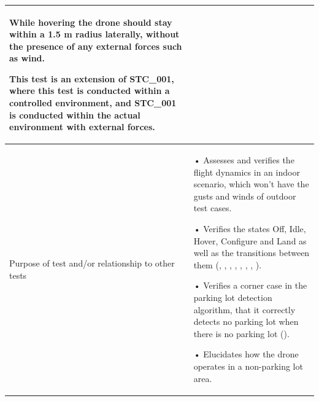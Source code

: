 \documentclass[12pt, titlepage]{article}
\begin{document}
\begin{table}[!h]
\begin{center}
\begin{tabular}{ | m{1.5cm} | m{15cm} | }
While hovering the drone should stay within a 1.5 m radius laterally, without the presence of any external forces such as wind.

This test is an extension of STC_001, where this test is conducted within a controlled environment, and STC_001 is conducted within the actual environment with external forces. \\ 
\hline
Purpose of test and/or relationship to other tests &  • Assesses and verifies the flight dynamics in an indoor scenario, which won't have the gusts and winds of outdoor test cases.

• Verifies the states Off, Idle, Hover, Configure and Land as well as the transitions between them (\nameref{STA_000}, \nameref{STA_001}, \nameref{STA_004}, \nameref{STA_005}, \nameref{STA_006}, \nameref{TRANS_002}, \nameref{TRANS_003}, \nameref{TRANS_009}).

• Verifies a corner case in the parking lot detection algorithm, that it correctly detects no parking lot when there is no parking lot (\nameref{GEN_001}).

• Elucidates how the drone operates in a non-parking lot area.
\\ 
\hline
\end{tabular}
\end{center}
\end{table}
\end{document}
